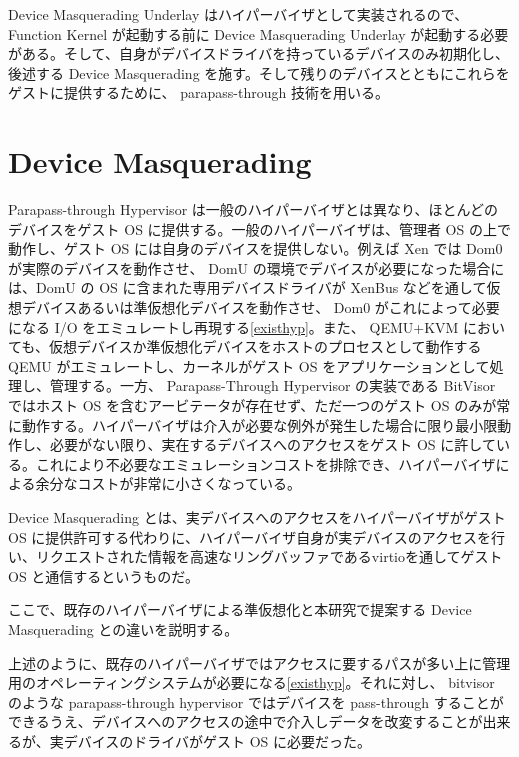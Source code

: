 \documentclass[a4paper,11pt,report]{ltjsbook}
\begin{document}
Device Masquerading Underlay はハイパーバイザとして実装されるので、 Function Kernel が起動する前に Device Masquerading Underlay が起動する必要がある。そして、自身がデバイスドライバを持っているデバイスのみ初期化し、後述する Device Masquerading を施す。そして残りのデバイスとともにこれらをゲストに提供するために、 parapass-through 技術を用いる。

\section{Device Masquerading}

Parapass-through Hypervisor は一般のハイパーバイザとは異なり、ほとんどのデバイスをゲスト OS に提供する。一般のハイパーバイザは、管理者 OS の上で動作し、ゲスト OS には自身のデバイスを提供しない。例えば Xen では Dom0 が実際のデバイスを動作させ、 DomU の環境でデバイスが必要になった場合には、DomU の OS に含まれた専用デバイスドライバが XenBus などを通して仮想デバイスあるいは準仮想化デバイスを動作させ、 Dom0 がこれによって必要になる I/O をエミュレートし再現する\ref{existhyp}。また、 QEMU+KVM においても、仮想デバイスか準仮想化デバイスをホストのプロセスとして動作する QEMU がエミュレートし、カーネルがゲスト OS をアプリケーションとして処理し、管理する。一方、 Parapass-Through Hypervisor の実装である BitVisor ではホスト OS を含むアービテータが存在せず、ただ一つのゲスト OS のみが常に動作する。ハイパーバイザは介入が必要な例外が発生した場合に限り最小限動作し、必要がない限り、実在するデバイスへのアクセスをゲスト OS に許している。これにより不必要なエミュレーションコストを排除でき、ハイパーバイザによる余分なコストが非常に小さくなっている\cite{bitvisor}。

Device Masquerading とは、実デバイスへのアクセスをハイパーバイザがゲスト OS に提供許可する代わりに、ハイパーバイザ自身が実デバイスのアクセスを行い、リクエストされた情報を高速なリングバッファであるvirtio\cite{virtio}を通してゲスト OS と通信するというものだ。

ここで、既存のハイパーバイザによる準仮想化と本研究で提案する Device Masquerading との違いを説明する。

上述のように、既存のハイパーバイザではアクセスに要するパスが多い上に管理用のオペレーティングシステムが必要になる\ref{existhyp}。それに対し、 bitvisor のような parapass-through hypervisor ではデバイスを pass-through することができるうえ、デバイスへのアクセスの途中で介入しデータを改変することが出来るが、実デバイスのドライバがゲスト OS に必要だった。
\end{document}
